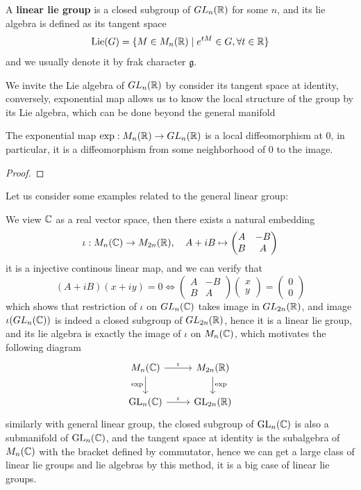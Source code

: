 \begin{colordefinition}
    A \textbf{linear lie group} is a closed subgroup of \(GL_n(\mathbb{R})\) for some \(n\), and its lie algebra is defined as its tangent space
    \[\mathrm{Lie}(G) = \{M \in M_n(\mathbb{R}) \mid e^{tM} \in G, \forall t \in \mathbb{R}\}\]
    and we usually denote it by frak character \(\mathfrak{g}\).
\end{colordefinition}

We invite the Lie algebra of \(GL_n(\mathbb{R})\) by consider its tangent space at identity, conversely, exponential map allows us to know the local structure of the group by its Lie algebra, which can be done beyond the general manifold
\begin{theorem}
    The exponential map \(\exp: M_n(\mathbb{R}) \to GL_n(\mathbb{R})\) is a local diffeomorphism at \(0\), in particular, it is a diffeomorphism from some neighborhood of \(0\) to the image.
\end{theorem}

\begin{proof}
    
\end{proof}

Let us consider some examples related to the general linear group:

\begin{example}
    We view \(\mathbb{C}\) as a real vector space, then there exists a natural embedding
    \[\iota:M_n(\mathbb{C}) \to M_{2n}(\mathbb{R}), \quad A+iB \mapsto \begin{pmatrix} A & -B \\ B & A \end{pmatrix}\]
    it is a injective continous linear map, and we can verify that 
    \[(A+iB)(x+iy) = 0 \iff \begin{pmatrix}
        A & -B \\
        B & A 
    \end{pmatrix} \begin{pmatrix} x \\ y \end{pmatrix} = \begin{pmatrix} 0 \\ 0 \end{pmatrix}\]
    which shows that restriction of \(\iota\) on \(GL_n(\mathbb{C})\) takes image in \(GL_{2n}(\mathbb{R})\), and image \(\iota(GL_n(\mathbb{C}))\) is indeed a closed subgroup of \(GL_{2n}(\mathbb{R})\), hence it is a linear lie group, and its lie algebra is exactly the image of \(\iota\) on \(M_n(\mathbb{C})\), which motivates the following diagram    
    \[
\begin{tikzcd}
M_n(\mathbb{C}) \arrow[r, "\iota"] \arrow[d, "\exp"'] 
& M_{2n}(\mathbb{R}) \arrow[d, "\exp"] \\
\mathrm{GL}_n(\mathbb{C}) \arrow[r, "\iota"] 
& \mathrm{GL}_{2n}(\mathbb{R})
\end{tikzcd}
\]
similarly with general linear group, the closed subgroup of \(\operatorname{GL}_n(\mathbb{C})\) is also a submanifold of \(\operatorname{GL}_n(\mathbb{C})\), and the tangent space at identity is the subalgebra of \(M_n(\mathbb{C})\) with the bracket defined by commutator, hence we can get a large class of linear lie groups and lie algebras by this method, it is a big case of linear lie groups.
\end{example}

